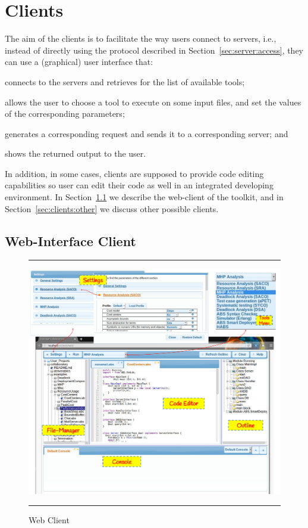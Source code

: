 {%
}

\chapter{\ei Clients}
\label{ch:clients}


The aim of the \ei clients is to facilitate the way users connect to
\ei servers, i.e., instead of directly using the protocol described in
Section~\ref{sec:server:access}, they can use a (graphical) user
interface that:
%
\begin{inparaenum}
%
\item connects to the \ei servers and retrieves for the list of
  available tools;
%
\item allows the user to choose a tool to execute on some input files,
  and set the values of the corresponding parameters;
%
\item generates a corresponding request and sends it to a
  corresponding \ei server; and
%
\item shows the returned output to the user.
\end{inparaenum}
%
In addition, in some cases, clients are supposed to provide code
editing capabilities so user can edit their code as well in an
integrated developing environment.
%
In Section~\ref{sec:clients:web} we describe the web-client of the \ei
toolkit, and in Section~\ref{sec:clients:other} we discuss other
possible clients.
%


\section{Web-Interface Client}
\label{sec:clients:web}

\begin{figure}[h]
\hrule\smallskip
\begin{center}
\includegraphics[width=1\textwidth]{fig/webclient2.pdf}
\end{center}
\caption{\ei Web Client}
\label{fig:clients:web}
\hrule
\end{figure}

